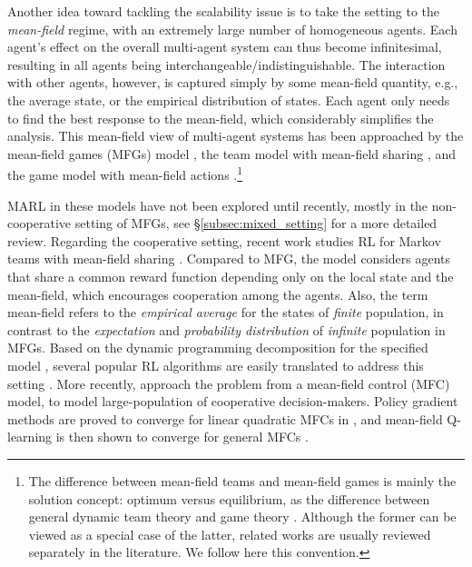 Another  idea toward tackling the scalability issue  is to take the setting to the \emph{mean-field} regime, with an extremely large number of homogeneous agents. 
Each agent's effect on the overall multi-agent system can thus become  infinitesimal, resulting in all agents being  interchangeable/indistinguishable. The interaction with other agents,  however, is captured simply by some mean-field quantity, e.g., the average state, or the empirical distribution of states. Each agent only needs to find the best response to the mean-field, which considerably simplifies the analysis.  
This mean-field view of multi-agent systems has been approached by the mean-field games (MFGs) model \cite{huang2003individual,huang2006large,lasry2007mean,bensoussan2013mean,tembine2013risk}, the team model with mean-field sharing \cite{arabneydi2014team,arabneydi2017new}, and the game model with mean-field actions \cite{pmlr-v80-yang18d}.\footnote{The difference between mean-field teams and mean-field games is mainly the solution concept: optimum versus equilibrium, as the difference between general dynamic team theory \cite{witsenhausen1971separation,yoshikawa1978decomposition,yuksel2013stochastic} and game theory \cite{shapley1953stochastic,filar2012competitive}. Although the former can be viewed as a special case of the latter, related works are usually reviewed separately in the literature.  We  follow here this convention. 
} 

MARL in these models have not been explored until recently, mostly in the non-cooperative setting of MFGs, see \S\ref{subsec:mixed_setting} for a more detailed review. Regarding the cooperative setting, recent work  \cite{subramanian2018reinforcement} studies RL for Markov teams with mean-field sharing \cite{arabneydi2014team,arabneydi2016linear,arabneydi2017new}. Compared to MFG, the model considers agents that share a common reward function depending only on the local state and the mean-field, which encourages cooperation among the  agents. Also, the term mean-field refers to the \emph{empirical average} for the states of \emph{finite} population, in contrast to the \emph{expectation} and \emph{probability distribution} of \emph{infinite} population in MFGs. 
 Based on the dynamic programming decomposition for the specified model  \cite{arabneydi2014team}, several popular  RL algorithms are easily translated to address this setting \cite{subramanian2018reinforcement}. More recently, \cite{carmona2019linear,carmona2019model}  approach the problem from a mean-field control (MFC) model,  to model large-population  of cooperative decision-makers. Policy gradient methods are proved to converge for linear quadratic MFCs in \cite{carmona2019linear}, and mean-field Q-learning is then shown to converge for general MFCs \cite{carmona2019model}.
 
